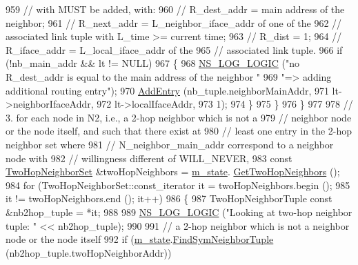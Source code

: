 \begin{DoxyCode}
959           \textcolor{comment}{// with MUST be added, with:}
960           \textcolor{comment}{//      R\_dest\_addr  = main address of the neighbor;}
961           \textcolor{comment}{//      R\_next\_addr  = L\_neighbor\_iface\_addr of one of the}
962           \textcolor{comment}{//                     associated link tuple with L\_time >= current time;}
963           \textcolor{comment}{//      R\_dist       = 1;}
964           \textcolor{comment}{//      R\_iface\_addr = L\_local\_iface\_addr of the}
965           \textcolor{comment}{//                     associated link tuple.}
966           \textcolor{keywordflow}{if} (!nb\_main\_addr && lt != NULL)
967             \{
968               \hyperlink{group__logging_ga88acd260151caf2db9c0fc84997f45ce}{NS\_LOG\_LOGIC} (\textcolor{stringliteral}{"no R\_dest\_addr is equal to the main address of the neighbor "}
969                             \textcolor{stringliteral}{"=> adding additional routing entry"});
970               \hyperlink{classns3_1_1olsr_1_1RoutingProtocol_a6ddb7dd3a6584b7d88dc5a41a61b1494}{AddEntry} (nb\_tuple.neighborMainAddr,
971                         lt->neighborIfaceAddr,
972                         lt->localIfaceAddr,
973                         1);
974             \}
975         \}
976     \}
977 
978   \textcolor{comment}{//  3. for each node in N2, i.e., a 2-hop neighbor which is not a}
979   \textcolor{comment}{//  neighbor node or the node itself, and such that there exist at}
980   \textcolor{comment}{//  least one entry in the 2-hop neighbor set where}
981   \textcolor{comment}{//  N\_neighbor\_main\_addr correspond to a neighbor node with}
982   \textcolor{comment}{//  willingness different of WILL\_NEVER,}
983   \textcolor{keyword}{const} \hyperlink{namespacens3_1_1olsr_a5f9963792af7fea4dc66fb8718394604}{TwoHopNeighborSet} &twoHopNeighbors = \hyperlink{classns3_1_1olsr_1_1RoutingProtocol_a07942ec1a7df71b609c8d2ff3b567c49}{m\_state}.
      \hyperlink{classns3_1_1olsr_1_1OlsrState_ab03738874d0d785b770beef6dc9c2e1a}{GetTwoHopNeighbors} ();
984   \textcolor{keywordflow}{for} (TwoHopNeighborSet::const\_iterator it = twoHopNeighbors.begin ();
985        it != twoHopNeighbors.end (); it++)
986     \{
987       TwoHopNeighborTuple \textcolor{keyword}{const} &nb2hop\_tuple = *it;
988 
989       \hyperlink{group__logging_ga88acd260151caf2db9c0fc84997f45ce}{NS\_LOG\_LOGIC} (\textcolor{stringliteral}{"Looking at two-hop neighbor tuple: "} << nb2hop\_tuple);
990 
991       \textcolor{comment}{// a 2-hop neighbor which is not a neighbor node or the node itself}
992       \textcolor{keywordflow}{if} (\hyperlink{classns3_1_1olsr_1_1RoutingProtocol_a07942ec1a7df71b609c8d2ff3b567c49}{m\_state}.\hyperlink{classns3_1_1olsr_1_1OlsrState_aa26af34492ae406f145c53bd189ed7fb}{FindSymNeighborTuple} (nb2hop\_tuple.twoHopNeighborAddr))

\end{DoxyCode}
